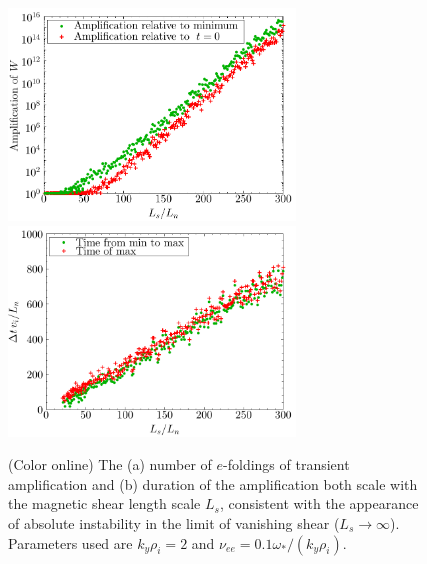 \documentclass[12pt,superscriptaddress]{revtex4}
\begin{document}
\begin{figure}[h!]
\includegraphics[width=3in]{m20141121_03_plotTransientAmplificationLsOverLnScanForPaper_a.pdf}
\includegraphics[width=3in]{m20141121_03_plotTransientAmplificationLsOverLnScanForPaper_b.pdf}
\caption{(Color online) The (a) number of $e$-foldings of transient amplification and (b)
duration of the amplification both scale with the magnetic shear length scale $L_s$,
consistent with the appearance of absolute instability in the limit of vanishing shear ($L_s \to \infty$).
Parameters used are $k_y \rho_i = 2$ and $\nu_{ee} = 0.1 \omega_*/(k_y \rho_i)$.
\label{fig:transientAmplificationVsLsOverLn}}
\end{figure}
\end{document}
